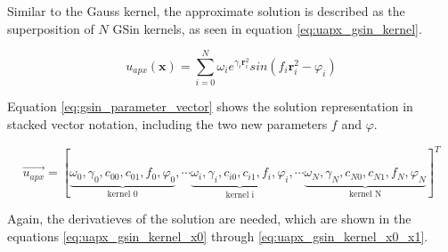 \documentclass[./\jobname.tex]{subfiles}
\begin{document}
\begin{figure}[H]
	\centering
	\noindent{}
	\label{fig:gsin_kernel_3d_plot}
\end{figure}

Similar to the Gauss kernel, the approximate solution is described as the superposition of $N$ GSin kernels, as seen in equation \ref{eq:uapx_gsin_kernel}. 

\begin{equation}
\label{eq:uapx_gsin_kernel}
u_{apx}(\mathbf{x}) = \sum_{i=0}^{N} \omega_i e^{\gamma_i \mathbf{r}_i^2} sin(f_i \mathbf{r}_i^2 - \varphi_i)
\end{equation}

Equation \ref{eq:gsin_parameter_vector} shows the solution representation in stacked vector notation, including the two new parameters $f$ and $\varphi$. 

\begin{equation}
\label{eq:gsin_parameter_vector}
\vec{u_{apx}} = \left[\underbrace{\omega_0, \gamma_0, c_{00}, c_{01}, f_0, \varphi_0}_{\text{kernel 0}}, \cdots \underbrace{\omega_i, \gamma_i, c_{i0}, c_{i1}, f_i, \varphi_i}_{\text{kernel i}}, \cdots \underbrace{\omega_N, \gamma_N, c_{N0}, c_{N1}, f_N, \varphi_N}_{\text{kernel N}} \right]^T
\end{equation}

Again, the derivatieves of the solution are needed, which are shown in the equations \ref{eq:uapx_gsin_kernel_x0} through \ref{eq:uapx_gsin_kernel_x0_x1}. 
\end{document}
